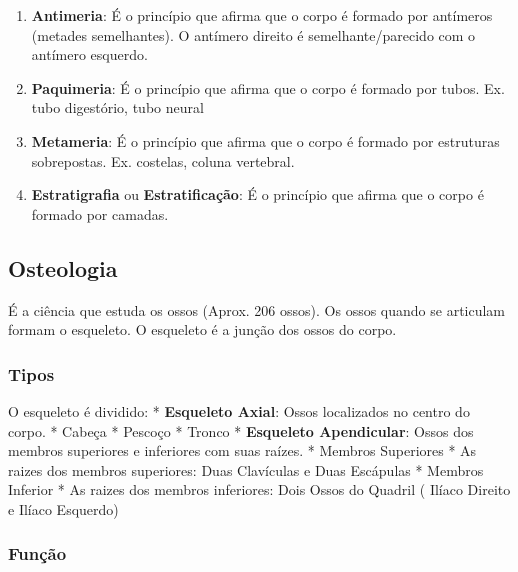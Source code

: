 \documentclass[
]{book}
\providecommand{\tightlist}{%
  \setlength{\itemsep}{0pt}\setlength{\parskip}{0pt}}
\begin{document}
\begin{enumerate}
\def\labelenumi{\arabic{enumi}.}
\tightlist
\item
  \textbf{Antimeria}: É o princípio que afirma que o corpo é formado por antímeros (metades semelhantes). O antímero direito é semelhante/parecido com o antímero esquerdo.
\item
  \textbf{Paquimeria}: É o princípio que afirma que o corpo é formado por tubos. Ex. tubo digestório, tubo neural
\item
  \textbf{Metameria}: É o princípio que afirma que o corpo é formado por estruturas sobrepostas. Ex. costelas, coluna vertebral.
\item
  \textbf{Estratigrafia} ou \textbf{Estratificação}: É o princípio que afirma que o corpo é formado por camadas.
\end{enumerate}

\hypertarget{osteologia}{%
\subsection{Osteologia}\label{osteologia}}

É a ciência que estuda os ossos (Aprox. 206 ossos). Os ossos quando se articulam formam o esqueleto. O esqueleto é a junção dos ossos do corpo.

\hypertarget{tipos}{%
\subsubsection{Tipos}\label{tipos}}

O esqueleto é dividido:
* \textbf{Esqueleto Axial}: Ossos localizados no centro do corpo.
* Cabeça
* Pescoço
* Tronco
* \textbf{Esqueleto Apendicular}: Ossos dos membros superiores e inferiores com suas raízes.
* Membros Superiores
* As raizes dos membros superiores: Duas Clavículas e Duas Escápulas
* Membros Inferior
* As raizes dos membros inferiores: Dois Ossos do Quadril ( Ilíaco Direito e Ilíaco Esquerdo)

\hypertarget{funuxe7uxe3o}{%
\subsubsection{Função}\label{funuxe7uxe3o}}
\end{document}
